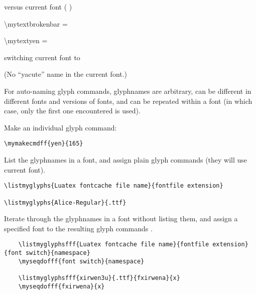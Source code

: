 \documentclass{article}
\begin{document}
versus current font ( \fontname\font )

\textbackslash mytextbrokenbar = \mytextbrokenbar

\textbackslash mytextyen = \mytextyen

\cdr{\mytextxbrokenbar}

\cdr{\mytextxyacute}

\cdr{\mytextxparagraph}

\cdr{\mytextxsection}

switching current font to \flabblue \fontname\font


\cdr{\mytextxbrokenbar}

\cdr{\mytextbrokenbar}

\cdr{\mytextyen}

\cdr{\mytextxyacute} (No ``yacute'' name in the current font.)

For auto-naming glyph commands, glyphnames are arbitrary, can be different in different fonts and versions of fonts, and can be repeated within a font (in which case, only the first one encountered is used).

\par\bigskip
Make an individual glyph command:

\begin{verbatim}
\mymakecmdff{yen}{165}
\end{verbatim}

\cdr{\mytextyen}

\cdr{\mytextbrokenbar}

List the glyphnames in a font, and assign plain glyph commands (they will use current font).

\begin{verbatim}
\listmyglyphs{Luatex fontcache file name}{fontfile extension}

\listmyglyphs{Alice-Regular}{.ttf}
\end{verbatim}

Iterate through the glyphnames in a font without listing them, and assign a specified font to the resulting glyph commands .

\begin{verbatim}
	\listmyglyphsfff{Luatex fontcache file name}{fontfile extension}{font switch}{namespace}
	\myseqdofff{font switch}{namespace}
	
	\listmyglyphsfff{xirwen3u}{.ttf}{fxirwena}{x}
	\myseqdofff{fxirwena}{x}
\end{verbatim}
\end{document}
